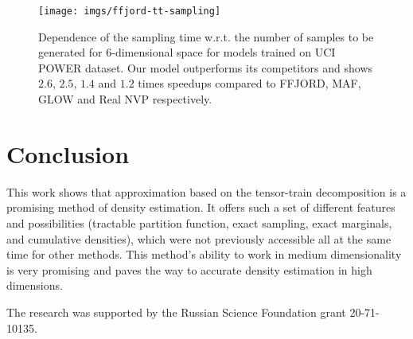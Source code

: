 \documentclass[accepted]{uai2021}
\begin{document}
  \begin{figure}[t]
    \centering
    \texttt{[image: imgs/ffjord-tt-sampling]}
    \caption{Dependence of the sampling time w.r.t. the number of samples to be generated for $6$-dimensional space for models trained on UCI POWER dataset. Our model outperforms its competitors and shows $2.6$, $2.5$, $1.4$ and $1.2$ times speedups compared to FFJORD, MAF, GLOW and Real NVP respectively.} \label{fig:ffjord-tt-sampling}
  \end{figure}


  \section{Conclusion}
  \label{sec:conclusion}
  This work shows that approximation based on the tensor-train decomposition is a promising method of density estimation. It offers such a set of different features and possibilities (tractable partition function, exact sampling, exact marginals, and cumulative densities), which were not previously accessible all at the same time for other methods. This method's ability to work in medium dimensionality is very promising and paves the way to accurate density estimation in high dimensions.


  \acknowledgements
  The research was supported by the Russian Science Foundation grant 20-71-10135.

  


\end{document}
